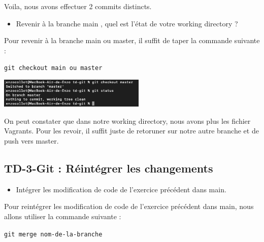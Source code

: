 \documentclass[12pt]{article}
\begin{document}
Voila, nous avons effectuer 2 commits distincts.

\vspace{0.3cm}

\begin{itemize}
  \item Revenir à la branche main , quel est l'état de votre working directory ?
\end{itemize}

\vspace{0.3cm}

Pour revenir à la branche main ou master, il suffit de taper la commande suivante : 

\texttt{git checkout main ou master}

\vspace{0.3cm}

\begin{center}
  \includegraphics[width=7cm]{Image-TD-Git-2/git-checkout-master.png}
\end{center}

\vspace{0.3cm}

On peut constater que dans notre working directory, nous avons plus les fichier Vagrants. Pour les revoir, il suffit juste de retoruner sur notre autre branche et de push vers master.


\newpage

\subsection{TD-3-Git : Réintégrer les changements}

\vspace{0.3cm}

\begin{itemize}
  \item Intégrer les modification de code de l'exercice précédent dans main.
\end{itemize}

\vspace{0.3cm}

Pour reintégrer les modification de code de l'exercice précédent dans main, nous allons utiliser la commande suivante : 

\texttt{git merge nom-de-la-branche}

\vspace{0.3cm}
\end{document}
